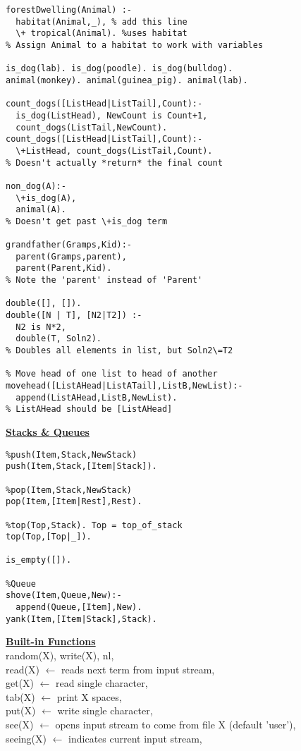 \documentclass[8pt,letterpaper,twocolumn]{article}
\begin{document}
\begin{verbatim}
forestDwelling(Animal) :-
  habitat(Animal,_), % add this line
  \+ tropical(Animal). %uses habitat
% Assign Animal to a habitat to work with variables

is_dog(lab). is_dog(poodle). is_dog(bulldog).
animal(monkey). animal(guinea_pig). animal(lab).

count_dogs([ListHead|ListTail],Count):-
  is_dog(ListHead), NewCount is Count+1,
  count_dogs(ListTail,NewCount).
count_dogs([ListHead|ListTail],Count):-
  \+ListHead, count_dogs(ListTail,Count).
% Doesn't actually *return* the final count

non_dog(A):-
  \+is_dog(A),
  animal(A).
% Doesn't get past \+is_dog term

grandfather(Gramps,Kid):-
  parent(Gramps,parent),
  parent(Parent,Kid).
% Note the 'parent' instead of 'Parent'

double([], []).
double([N | T], [N2|T2]) :-
  N2 is N*2,
  double(T, Soln2).
% Doubles all elements in list, but Soln2\=T2

% Move head of one list to head of another
movehead([ListAHead|ListATail],ListB,NewList):-
  append(ListAHead,ListB,NewList).
% ListAHead should be [ListAHead]
\end{verbatim}
\underline{\textbf{Stacks \& Queues}}
\begin{verbatim}
%push(Item,Stack,NewStack)
push(Item,Stack,[Item|Stack]).

%pop(Item,Stack,NewStack)
pop(Item,[Item|Rest],Rest).

%top(Top,Stack). Top = top_of_stack
top(Top,[Top|_]).

is_empty([]).

%Queue
shove(Item,Queue,New):-
  append(Queue,[Item],New).
yank(Item,[Item|Stack],Stack).
\end{verbatim}
\underline{\textbf{Built-in Functions}}\\
random(X), write(X), nl,\\
read(X) $\leftarrow$ reads next term from input stream,\\
get(X) $\leftarrow$ read single character,\\
tab(X) $\leftarrow$ print X spaces,\\
put(X) $\leftarrow$ write single character,\\
see(X) $\leftarrow$ opens input stream to come from file X (default 'user'),\\
seeing(X) $\leftarrow$ indicates current input stream,\\
\end{document}
